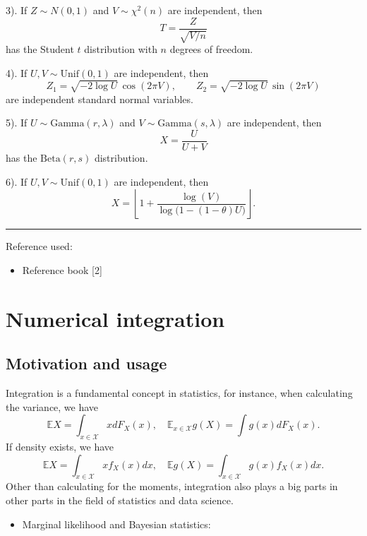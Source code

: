 \documentclass[
  letterpaper,
  DIV=11,
  numbers=noendperiod]{scrreprt}
\providecommand{\tightlist}{%
  \setlength{\itemsep}{0pt}\setlength{\parskip}{0pt}}
\begin{document}
3). If \(Z \sim N(0,1)\) and \(V \sim \chi^2(n)\) are independent, then
\[
  T = \frac{Z}{\sqrt{V/n}}
  \] has the Student \(t\) distribution with \(n\) degrees of freedom.

4). If \(U,V \sim \text{Unif}(0,1)\) are independent, then \[
  Z_1 = \sqrt{-2 \log U}\, \cos(2\pi V), 
  \qquad
  Z_2 = \sqrt{-2 \log U}\, \sin(2\pi V)
  \] are independent standard normal variables.

5). If \(U \sim \text{Gamma}(r,\lambda)\) and
\(V \sim \text{Gamma}(s,\lambda)\) are independent, then \[
  X = \frac{U}{U+V}
  \] has the \(\text{Beta}(r,s)\) distribution.

6). If \(U,V \sim \text{Unif}(0,1)\) are independent, then \[
  X = \left\lfloor 1 + \frac{\log(V)}{\log\big(1 - (1-\theta)U\big)} \right\rfloor.
  \]

\begin{center}\rule{0.5\linewidth}{0.5pt}\end{center}

Reference used:

\begin{itemize}
\tightlist
\item
  Reference book {[}2{]}
\end{itemize}


\chapter{Numerical integration}\label{numerical-integration}

\newcommand{\E}{\mathbb E}
\newcommand{\X}{\mathcal X}

\section{Motivation and usage}\label{motivation-and-usage}

Integration is a fundamental concept in statistics, for instance, when
calculating the variance, we have \[
  \mathbb EX = \int_{x\in\mathcal X} x dF_X(x),\quad \mathbb E_{x\in\mathcal X} g(X) = \int g(x) dF_X(x).
\] If density exists, we have \[
\mathbb EX = \int_{x\in\mathcal X} x f_X(x) dx,\quad \mathbb Eg(X) = \int_{x\in\mathcal X} g(x) f_X(x) dx.
\] Other than calculating for the moments, integration also plays a big
parts in other parts in the field of statistics and data science.

\begin{itemize}
\tightlist
\item
  Marginal likelihood and Bayesian statistics:
\end{itemize}
\end{document}
